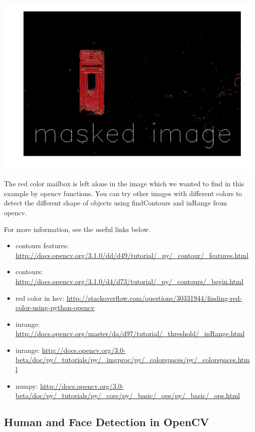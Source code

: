 \includegraphics{facedetection_files/facedetection_49_0.png}

The red color mailbox is left alone in the image which we wanted to find
in this example by opencv functions. You can try other images with
different colors to detect the different shape of objects using
findContours and inRange from opencv.

For more information, see the useful links below.

\begin{itemize}
\tightlist
\item
  contours features:
  \url{http://docs.opencv.org/3.1.0/dd/d49/tutorial/_py/_contour/_features.html}
\item
  contours:
  \url{http://docs.opencv.org/3.1.0/d4/d73/tutorial/_py/_contours/_begin.html}
\item
  red color in hsv:
  \url{http://stackoverflow.com/questions/30331944/finding-red-color-using-python-opencv}
\item
  inrange:
  \url{http://docs.opencv.org/master/da/d97/tutorial/_threshold/_inRange.html}
\item
  inrange:
  \url{http://docs.opencv.org/3.0-beta/doc/py/_tutorials/py/_imgproc/py/_colorspaces/py/_colorspaces.html}
\item
  numpy:
  \url{http://docs.opencv.org/3.0-beta/doc/py/_tutorials/py/_core/py/_basic/_ops/py/_basic/_ops.html}
\end{itemize}

\subsection{Human and Face Detection in
OpenCV}\label{human-and-face-detection-in-opencv}

